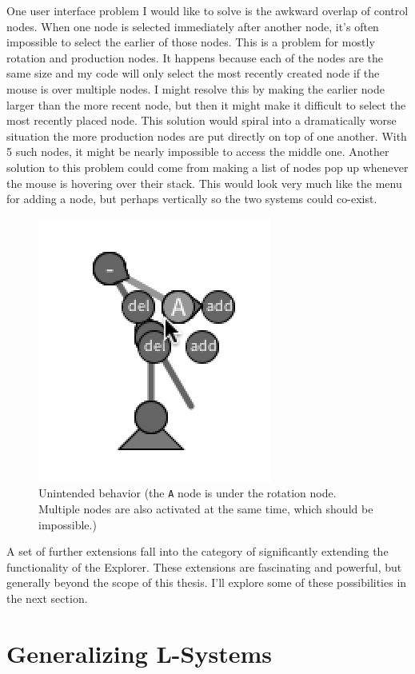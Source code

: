 \documentclass[12pt,twoside]{reedthesis}
\newcommand{\code}[1]{\texttt{#1}}
\begin{document}
	One user interface problem I would like to solve is the awkward overlap of control nodes. When one node is selected immediately after another node, it's often impossible to select the earlier of those nodes. This is a problem for mostly rotation and production nodes. It happens because each of the nodes are the same size and my code will only select the most recently created node if the mouse is over multiple nodes. I might resolve this by making the earlier node larger than the more recent node, but then it might make it difficult to select the most recently placed node. This solution would spiral into a dramatically worse situation the more production nodes are put directly on top of one another. With 5 such nodes, it might be nearly impossible to access the middle one. Another solution to this problem could come from making a list of nodes pop up whenever the mouse is hovering over their stack. This would look very much like the menu for adding a node, but perhaps vertically so the two systems could co-exist.
	
	\begin{figure}[h]
	\centering
	\includegraphics[height = 0.4\linewidth]{Images/BuggyBehavior}
	\caption[Unintended Behavior]{Unintended behavior (the \code{A} node is under the rotation node. Multiple nodes are also activated at the same time, which should be impossible.)}
	\label{Buggy}
	\end{figure}
	
	A set of further extensions fall into the category of significantly extending the functionality of the Explorer. These extensions are fascinating and powerful, but generally beyond the scope of this thesis. I'll explore some of these possibilities in the next section.

\section{Generalizing L-Systems}
\label{Generalizations}
\end{document}
